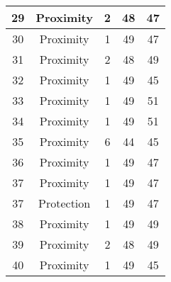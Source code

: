 \documentclass[results.tex]{subfiles}
\begin{document}
\begin{center}
\begin{tabular}{| c || c | c | c | c |}
            \hline
            29                      & Proximity                    & 2                      & 48                      & 47                   \\
            \hline
            30                      & Proximity                    & 1                      & 49                      & 47                   \\
            \hline
            31                      & Proximity                    & 2                      & 48                      & 49                   \\
            \hline
            32                      & Proximity                    & 1                      & 49                      & 45                   \\
            \hline
            33                      & Proximity                    & 1                      & 49                      & 51                   \\
            \hline
            34                      & Proximity                    & 1                      & 49                      & 51                   \\
            \hline
            35                      & Proximity                    & 6                      & 44                      & 45                   \\
            \hline
            36                      & Proximity                    & 1                      & 49                      & 47                   \\
            \hline
            37                      & Proximity                    & 1                      & 49                      & 47                   \\
            \hline
            37                      & Protection                   & 1                      & 49                      & 47                   \\
            \hline
            38                      & Proximity                    & 1                      & 49                      & 49                   \\
            \hline
            39                      & Proximity                    & 2                      & 48                      & 49                   \\
            \hline
            40                      & Proximity                    & 1                      & 49                      & 45                   \\

\end{tabular}
\end{center}
\end{document}
